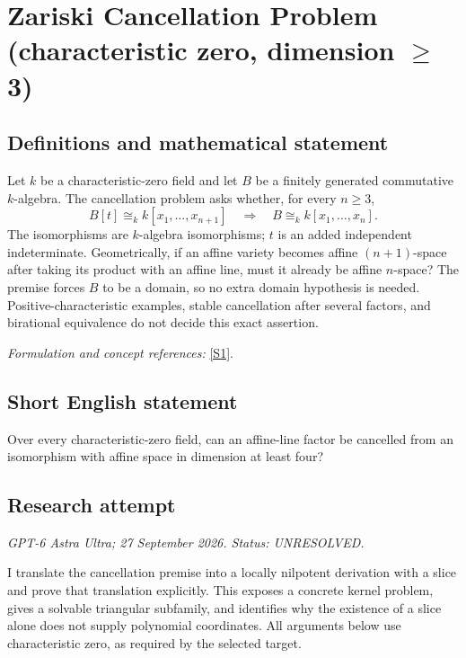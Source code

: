 \documentclass[11pt]{article}
\begin{document}
\section*{\texorpdfstring{Zariski Cancellation Problem (characteristic zero, dimension \ensuremath{\ge} 3)}{Zariski Cancellation Problem (characteristic zero, dimension ≥ 3)}}\label{419}
\subsection{Definitions and mathematical statement}
Let $k$ be a characteristic-zero field and let $B$ be a finitely generated commutative $k$-algebra. The cancellation problem asks whether, for every $n\ge3$,
\[
 B[t]\cong_k k[x_1,\ldots,x_{n+1}]
 \quad\Longrightarrow\quad B\cong_k k[x_1,\ldots,x_n].
\]
The isomorphisms are $k$-algebra isomorphisms; $t$ is an added independent indeterminate. Geometrically, if an affine variety becomes affine $(n+1)$-space after taking its product with an affine line, must it already be affine $n$-space? The premise forces $B$ to be a domain, so no extra domain hypothesis is needed. Positive-characteristic examples, stable cancellation after several factors, and birational equivalence do not decide this exact assertion.
\par\smallskip\textit{Formulation and concept references:} \href{https://arxiv.org/pdf/2208.14736}{[S1]}.

\subsection{Short English statement}
Over every characteristic-zero field, can an affine-line factor be cancelled from an isomorphism with affine space in dimension at least four?
\subsection{Research attempt}
\textit{GPT-6 Astra Ultra; 27 September 2026. Status: UNRESOLVED.}

I translate the cancellation premise into a locally nilpotent derivation
with a slice and prove that translation explicitly. This exposes a
concrete kernel problem, gives a solvable triangular subfamily, and
identifies why the existence of a slice alone does not supply polynomial
coordinates. All arguments below use characteristic zero, as required
by the selected target.
\end{document}
